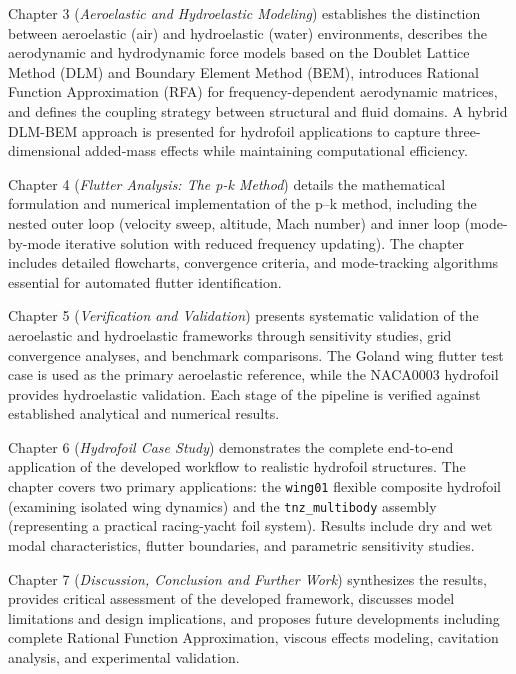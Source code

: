 Chapter 3 (\textit{Aeroelastic and Hydroelastic Modeling}) establishes the distinction between aeroelastic (air) and hydroelastic (water) environments, describes the aerodynamic and hydrodynamic force models based on the Doublet Lattice Method (DLM) and Boundary Element Method (BEM), introduces Rational Function Approximation (RFA) for frequency-dependent aerodynamic matrices, and defines the coupling strategy between structural and fluid domains. A hybrid DLM-BEM approach is presented for hydrofoil applications to capture three-dimensional added-mass effects while maintaining computational efficiency.

Chapter 4 (\textit{Flutter Analysis: The p-k Method}) details the mathematical formulation and numerical implementation of the p--k method, including the nested outer loop (velocity sweep, altitude, Mach number) and inner loop (mode-by-mode iterative solution with reduced frequency updating). The chapter includes detailed flowcharts, convergence criteria, and mode-tracking algorithms essential for automated flutter identification.

Chapter 5 (\textit{Verification and Validation}) presents systematic validation of the aeroelastic and hydroelastic frameworks through sensitivity studies, grid convergence analyses, and benchmark comparisons. The Goland wing flutter test case is used as the primary aeroelastic reference, while the NACA0003 hydrofoil provides hydroelastic validation. Each stage of the pipeline is verified against established analytical and numerical results.

Chapter 6 (\textit{Hydrofoil Case Study}) demonstrates the complete end-to-end application of the developed workflow to realistic hydrofoil structures. The chapter covers two primary applications: the \texttt{wing01} flexible composite hydrofoil (examining isolated wing dynamics) and the \texttt{tnz\_multibody} assembly (representing a practical racing-yacht foil system). Results include dry and wet modal characteristics, flutter boundaries, and parametric sensitivity studies.

Chapter 7 (\textit{Discussion, Conclusion and Further Work}) synthesizes the results, provides critical assessment of the developed framework, discusses model limitations and design implications, and proposes future developments including complete Rational Function Approximation, viscous effects modeling, cavitation analysis, and experimental validation.

